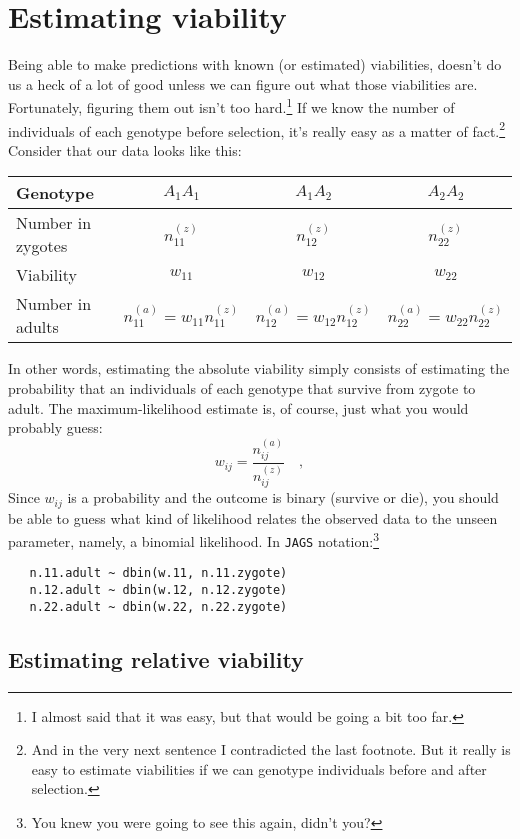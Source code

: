 \chapter{Estimating viability}

Being able to make predictions with known (or estimated) viabilities,
doesn't do us a heck of a lot of good unless we can figure out what
those viabilities are. Fortunately, figuring them out isn't too
hard.\footnote{I almost said that it was easy, but that would be going
  a bit too far.} If we know the number of individuals of each
genotype before selection, it's really easy as a matter of
fact.\footnote{And in the very next sentence I contradicted the last
  footnote. But it really is easy to estimate viabilities if we can
  genotype individuals before and after selection.} Consider that our
data looks like this:

\begin{center}
\begin{tabular}{l|ccc}
\hline\hline
Genotype & $A_1A_1$ & $A_1A_2$ & $A_2A_2$ \\
\hline
Number in zygotes & $n_{11}^{(z)}$ & $n_{12}^{(z)}$ & $n_{22}^{(z)}$ \\
Viability         & $w_{11}$ & $w_{12}$ & $w_{22}$ \\
Number in adults  & $n_{11}^{(a)} = w_{11}n_{11}^{(z)}$ & $n_{12}^{(a)} = w_{12}n_{12}^{(z)}$ & $n_{22}^{(a)} = w_{22}n_{22}^{(z)}$ \\
\hline
\end{tabular}
\end{center}

In other words, estimating the absolute viability simply consists of
estimating the probability that an individuals of each genotype that
survive from zygote to adult. The maximum-likelihood estimate is, of
course, just what you would probably guess:
\[
w_{ij} = \frac{n_{ij}^{(a)}}{n_{ij}^{(z)}} \quad ,
\]
Since $w_{ij}$ is a probability and the outcome is binary (survive or
die), you should be able to guess what kind of likelihood relates the
observed data to the unseen parameter, namely, a binomial
likelihood. In {\tt JAGS} notation:\footnote{You knew you were going
  to see this again, didn't you?}
\begin{verbatim}
   n.11.adult ~ dbin(w.11, n.11.zygote)
   n.12.adult ~ dbin(w.12, n.12.zygote)
   n.22.adult ~ dbin(w.22, n.22.zygote)
\end{verbatim}

\section*{Estimating relative viability}

